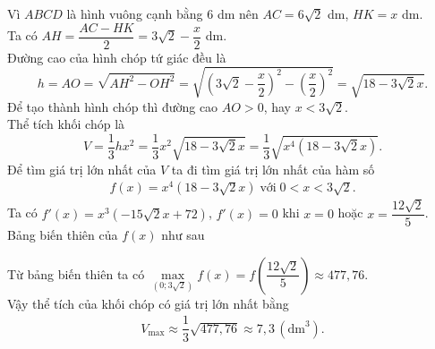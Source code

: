 \begin{ex}
{\begin{center}
\end{center}
Vì $ABCD$ là hình vuông cạnh bằng $6$ dm nên $AC=6\sqrt{2}$ dm, $HK=x$ dm.\\
Ta có $AH=\dfrac{AC-HK}{2}=3\sqrt{2}-\dfrac{x}{2}$ dm.\\
Đường cao của hình chóp tứ giác đều là
\[h=AO=\sqrt{AH^2-OH^2}=\sqrt{\left(3\sqrt{2}-\dfrac{x}{2}\right)^2-\left(\dfrac{x}{2}\right)^2}=\sqrt{18-3\sqrt{2}x}.\]
Để tạo thành hình chóp thì đường cao $AO>0$, hay $x<3\sqrt{2}$.\\
Thể tích khối chóp là
\[V=\dfrac{1}{3}hx^2=\dfrac{1}{3}x^2\sqrt{18-3\sqrt{2}x}=\dfrac{1}{3}\sqrt{x^4\left(18-3\sqrt{2}x\right)}.\]
Để tìm giá trị lớn nhất của $V$ ta đi tìm giá trị lớn nhất của hàm số
\allowdisplaybreaks
\begin{eqnarray*}
f(x)=x^4\left(18-3\sqrt{2}x\right)\;\text{với}\;0<x<3\sqrt{2}.
\end{eqnarray*}
Ta có $f'(x)=x^3\left(-15 \sqrt{2} x+72\right)$, $f'(x)=0$ khi $x=0$ hoặc $x=\dfrac{12 \sqrt{2}}{5}$.\\
Bảng biến thiên của $f(x)$ như sau
\begin{center}
\end{center}
Từ bảng biến thiên ta có $\max\limits_{(0; 3 \sqrt{2})}f(x)=f\left(\dfrac{12 \sqrt{2}}{5}\right)\approx 477{,}76$.\\
Vậy thể tích của khối chóp có giá trị lớn nhất bằng
\allowdisplaybreaks
\begin{eqnarray*}
V_{\max}\approx\dfrac{1}{3}\sqrt{477{,}76}\approx7{,}3\,\left(\text{dm}^3\right).
\end{eqnarray*}
}
\end{ex}

